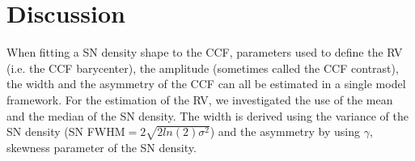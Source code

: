 \documentclass{aa}
\begin{document}


\section{Discussion} \label{sec:discu}

When fitting a SN density shape to the CCF, parameters used to define the RV (i.e. the CCF barycenter), the amplitude (sometimes called the CCF contrast), the width and the asymmetry of the CCF can all be estimated in a single model framework.
For the estimation of the RV, we investigated the use of the mean and the median of the SN density. 
The width is derived using the variance of the SN density (SN FWHM$=2\sqrt{2ln(2)\sigma^2}$) and the asymmetry by using $\gamma$, skewness parameter of the SN density.
\end{document}
